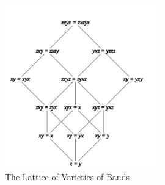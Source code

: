 \begin{figure}\begin{center}
\includegraphics[width=0.6\textwidth]{bands}\end{center}
\caption{The Lattice of Varieties of Bands}\label{fig:bands}
\end{figure}

%
%
%
%
%
%
%
%
%
